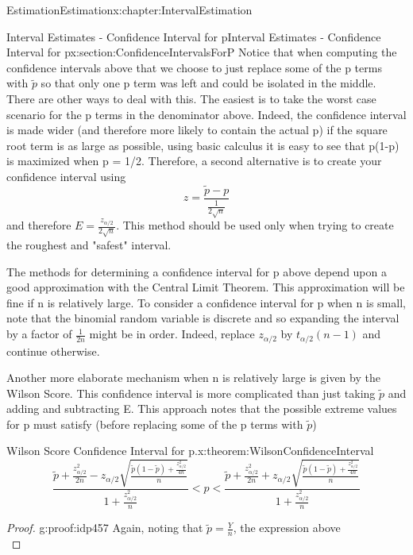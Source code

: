 \documentclass[oneside,10pt,]{book}
\numberwithin{equation}{section}
\newcommand{\lt}{<}
\begin{document}
\begin{chapterptx}{Estimation}{}{Estimation}{}{}{x:chapter:IntervalEstimation}
\begin{sectionptx}{Interval Estimates - Confidence Interval for p}{}{Interval Estimates - Confidence Interval for p}{}{}{x:section:ConfidenceIntervalsForP}
Notice that when computing the confidence intervals above that we choose to just replace some of the p terms with \(\tilde{p}\) so that only one p term was left and could be isolated in the middle. There are other ways to deal with this. The easiest is to take the worst case scenario for the p terms in the denominator above. Indeed, the confidence interval is made wider (and therefore more likely to contain the actual p) if the square root term is as large as possible, using basic calculus it is easy to see that p(1-p) is maximized when p = 1\slash{}2. Therefore, a second alternative is to create your confidence interval using%
\begin{equation*}
z = \frac{\tilde{p} - p}{\frac{1}{2\sqrt{n}}}
\end{equation*}
and therefore \(E = \frac{z_{ \alpha/2}}{2\sqrt{n}}\). This method should be used only when trying to create the roughest and "safest" interval.%
\par
The methods for determining a confidence interval for p above depend upon a good approximation with the Central Limit Theorem. This approximation will be fine if n is relatively large. To consider a confidence interval for p when n is small, note that the binomial random variable is discrete and so expanding the interval by a factor of \(\frac{1}{2n}\) might be in order. Indeed, replace \(z_{\alpha/2}\) by \(t_{\alpha/2}(n-1)\) and continue otherwise.%
\par
Another more elaborate mechanism when n is relatively large is given by the Wilson Score. This confidence interval is more complicated than just taking \(\tilde{p}\) and adding and subtracting E. This approach notes that the possible extreme values for p must satisfy (before replacing some of the p terms with \(\tilde{p}\))%
\begin{theorem}{Wilson Score Confidence Interval for p.}{}{x:theorem:WilsonConfidenceInterval}%
%
\begin{equation*}
\frac{\tilde{p} + \frac{z_{\alpha/2}^2}{2n} - z_{\alpha/2} \sqrt{\frac{\tilde{p}(1-\tilde{p}) + \frac{z_{\alpha/2}^2}{4n}}{n}}}{1 + \frac{z_{\alpha/2}^2}{n}} \lt p \lt \frac{\tilde{p} + \frac{z_{\alpha/2}^2}{2n} + z_{\alpha/2} \sqrt{\frac{\tilde{p}(1-\tilde{p}) + \frac{z_{\alpha/2}^2}{4n}}{n}}}{1 + \frac{z_{\alpha/2}^2}{n}}
\end{equation*}
%
\end{theorem}
\begin{proof}{}{g:proof:idp457}
Again, noting that \(\tilde{p} = \frac{Y}{n}\), the expression above%
\begin{equation*}

\end{equation*}
\end{proof}
\end{sectionptx}
\end{chapterptx}
\end{document}
